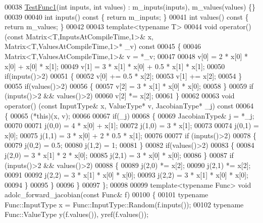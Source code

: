 \begin{DoxyCode}
00038   \hyperlink{struct_test_func1}{TestFunc1}(\textcolor{keywordtype}{int} inputs, \textcolor{keywordtype}{int} values) : m\_inputs(inputs), m\_values(values) \{\}
00039 
00040   \textcolor{keywordtype}{int} inputs()\textcolor{keyword}{ const }\{ \textcolor{keywordflow}{return} m\_inputs; \}
00041   \textcolor{keywordtype}{int} values()\textcolor{keyword}{ const }\{ \textcolor{keywordflow}{return} m\_values; \}
00042 
00043   \textcolor{keyword}{template}<\textcolor{keyword}{typename} T>
00044   \textcolor{keywordtype}{void} operator() (\textcolor{keyword}{const} Matrix<T,InputsAtCompileTime,1>& x, Matrix<T,ValuesAtCompileTime,1>* \_v)\textcolor{keyword}{ const}
00045 \textcolor{keyword}{  }\{
00046     Matrix<T,ValuesAtCompileTime,1>& v = *\_v;
00047 
00048     v[0] = 2 * x[0] * x[0] + x[0] * x[1];
00049     v[1] = 3 * x[1] * x[0] + 0.5 * x[1] * x[1];
00050     \textcolor{keywordflow}{if}(inputs()>2)
00051     \{
00052       v[0] += 0.5 * x[2];
00053       v[1] += x[2];
00054     \}
00055     \textcolor{keywordflow}{if}(values()>2)
00056     \{
00057       v[2] = 3 * x[1] * x[0] * x[0];
00058     \}
00059     \textcolor{keywordflow}{if} (inputs()>2 && values()>2)
00060       v[2] *= x[2];
00061   \}
00062 
00063   \textcolor{keywordtype}{void} operator() (\textcolor{keyword}{const} InputType& x, ValueType* v, JacobianType* \_j)\textcolor{keyword}{ const}
00064 \textcolor{keyword}{  }\{
00065     (*this)(x, v);
00066 
00067     \textcolor{keywordflow}{if}(\_j)
00068     \{
00069       JacobianType& j = *\_j;
00070 
00071       j(0,0) = 4 * x[0] + x[1];
00072       j(1,0) = 3 * x[1];
00073 
00074       j(0,1) = x[0];
00075       j(1,1) = 3 * x[0] + 2 * 0.5 * x[1];
00076 
00077       \textcolor{keywordflow}{if} (inputs()>2)
00078       \{
00079         j(0,2) = 0.5;
00080         j(1,2) = 1;
00081       \}
00082       \textcolor{keywordflow}{if}(values()>2)
00083       \{
00084         j(2,0) = 3 * x[1] * 2 * x[0];
00085         j(2,1) = 3 * x[0] * x[0];
00086       \}
00087       \textcolor{keywordflow}{if} (inputs()>2 && values()>2)
00088       \{
00089         j(2,0) *= x[2];
00090         j(2,1) *= x[2];
00091 
00092         j(2,2) = 3 * x[1] * x[0] * x[0];
00093         j(2,2) = 3 * x[1] * x[0] * x[0];
00094       \}
00095     \}
00096   \}
00097 \};
00098 
00099 \textcolor{keyword}{template}<\textcolor{keyword}{typename} Func> \textcolor{keywordtype}{void} adolc\_forward\_jacobian(\textcolor{keyword}{const} Func& f)
00100 \{
00101     \textcolor{keyword}{typename} Func::InputType x = Func::InputType::Random(f.inputs());
00102     \textcolor{keyword}{typename} Func::ValueType y(f.values()), yref(f.values());

\end{DoxyCode}

